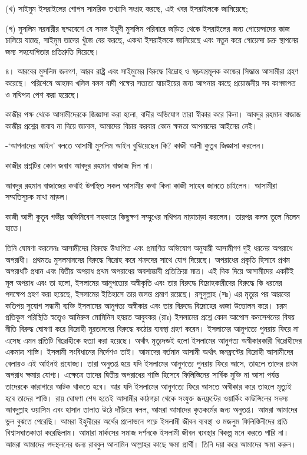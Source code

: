 \documentclass[
]{book}
\begin{document}
(খ) সাইমুম ইসরাইলের গোপন সামরিক তথ্যাদি সংগ্রহ করছে, এই খবর ইসরাইলকে জানিয়েছে;

(গ) মুসলিম নরনারীর ছদ্মবেশে যে সমস্ত ইহুদী মুসলিম পরিবারে জড়িত থেকে ইসরাইলের জন্য গোয়েন্দাদের কাজ চালিয়ে যাচ্ছে, সাইমুম তাদের খুঁজে বের করছে, একথা ইসরাইলকে জানিয়েছে এবং নতুন করে গোয়েন্দা চক্র স্থাপনের জন্য সহযোগিতার প্রতিশ্রুতি দিয়েছে।

৪। আরবের মুসলিম জনগণ, আরব রাষ্ট্র এবং সাইমুমের বিরুদ্ধে বিদ্রোহ ও ষড়যন্ত্রমূলক কাজের সিদ্ধান্ত আসামীরা গ্রহণ করেছে। পরিশেষে আহমদ খলিল বলল বাদী পক্ষের সত্যতা যাচাইয়ের জন্য আপনার কাছে প্রয়োজনীয় সব কাগজপত্র ও নথিপত্র পেশ করা হয়েছে।

কাজীর পক্ষ থেকে আসামীদেরকে জিজ্ঞাসা করা হলো, বাদীর অভিযোগ তারা স্বীকার করে কিনা। আবদুর রহমান বাজাজ কাজীর প্রশ্নের জবাব না দিয়ে জানাল, আমাদের বিচার করবার কোন ক্ষমতা আপনাদের আইনের নেই।

-`আপনাদের আইন' বলতে আসামী মুসলিম আইন বুঝিয়েছেন কি? কাজী আলী কুতুব জিজ্ঞাসা করলেন।

কাজীর প্রশ্নটির কোন জবাব আবদুর রহমান বাজাজ দিল না।

আবদুর রহমান বাজাজের কথাই উপস্থিত সকল আসামীর কথা কিনা কাজী সাহেব জানতে চাইলেন। আসামীরা সম্মতিসূচক মাথা নাড়ল।

কাজী আলী কুতুব গভীর অভিনিবেশ সহকারে কিছুক্ষণ সম্মুখের নথিপত্র নাড়াচাড়া করলেন। তারপর কলম তুলে নিলেন হাতে।

তিনি ঘোষণা করলেনঃ আসামীদের বিরুদ্ধে উত্থাপিত এবং প্রমাণিত অভিযোগ অনুযায়ী আসামীগণ দুই ধরনের অপরাধে অপরাধী। প্রথমতঃ মুসলমানদের বিরুদ্ধে বিদ্রোহ করে শত্রুদের সাথে যোগ দিয়েছে। অপরাধের প্রকৃতি হিসাবে প্রথম অপরাধটি প্রধান এবং দ্বিতীয় অপরাধ প্রথম অপরাধের অবশ্যম্ভাবী প্রতিক্রিয়া মাত্র। এই দিক দিয়ে আসামীদের একটিই মূল অপরাধ এবং তা হলো, ইসলামের আনুগত্যের অস্বীকৃতি এবং তার বিরুদ্ধে বিদ্রোহকারীদের বিরুদ্ধে কি ধরনের পদক্ষেপ গ্রহণ করা হয়েছে, ইসলামের ইতিহাসে তার জলন্ত প্রমাণ রয়েছে। রসূলুল্লাহ (সঃ) এর মৃত্যুর পর আরবের কতিপয় সুযোগ সন্ধানী ব্যক্তি ইসলামের আনুগত্য অস্বীকার এবং তার বিরুদ্ধে বিদ্রোহের ধ্বজা উত্তোলন করে। চরম প্রতিকূল পরিস্থিতি স্বত্ত্বেও আমিরুল মোমিনিন হযরত আবুবকর (রাঃ) ইসলামের প্রশ্নে কোন আপোস কনসেশনের বিষয় নীতি বিরুদ্ধ ঘোষণা করে বিদ্রোহী মুরতাদদের বিরুদ্ধে কঠোর ব্যবস্থা গ্রহণ করেন। ইসলামের আনুগত্যে পুনরায় ফিরে না এসেছ এমন প্রতিটি বিদ্রোহীকে হত্যা করা হয়েছে। অর্থাৎ মৃত্যুদন্ডই হলো ইসলামের আনুগত্য অস্বীকারকারী বিদ্রোহীদের একমাত্র শাস্তি। ইসলামী সংবিধানের নির্দেশও তাই। আমাদের বর্তমান আসামী অর্থাৎ জনফ্রন্টের বিদ্রোহী আসামীদের বেলায়ও এই আইনই প্রযোজ্য। তারা অনুতপ্ত হয়ে যদি ইসলামের আনুগত্যে পুনরায় ফিরে আসে, তাহলে তাদের প্রথম অপরাধ ক্ষমার যোগ্য। এক্ষেত্রে তাদের দ্বিতীয় অপরাধের শাস্তি হিসেবে ফিলিস্তিনের সার্বিক মুক্তি না আসা পর্যন্ত তাদেরকে কারাগারে আটক থাকতে হবে। আর যদি ইসলামের আনুগত্যে ফিরে আসতে অস্বীকার করে তাহলে মৃত্যুই হবে তাদের শাস্তি। রায় ঘোষণা শেষ হতেই আসামীর কাঠগড়া থেকে সংযুক্ত জনফ্রন্টের ওয়ার্কিং কাউন্সিলের সদস্য আবদুল্লাহ ওয়াসিম এবং হাসান তালাত উঠে দাঁড়িয়ে বলল, আমরা আমাদের কৃতকর্মের জন্য অনুতপ্ত। আমরা আমাদের ভুল বুঝতে পেরেছি। আমরা ইহুদীরের অর্থের প্রলোভনে পড়ে ইসলামী জীবন ব্যবস্থা ও মজলুম ফিলিস্তিনীদের প্রতি বিশ্বাসঘাতকাতা করেছিলাম। আমারা মার্কসের সমাজ দর্শনকে ইসলামী জীবন ব্যবস্থার বিকল্প মনে করতে পারি না। আমরা আমাদের পদস্থলনের জন্য রাববুল আলামিন আল্লাহর কাছে ক্ষমা প্রার্থী। তিনি দয়া করে আমাদের ক্ষমা করুন।
\end{document}
